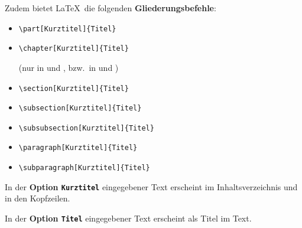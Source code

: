 \begin{frame}[fragile]

\noindent Zudem bietet \LaTeX\ die folgenden \textbf{Gliederungsbefehle}:

\begin{itemize}
\item \lstinline|\part[Kurztitel]{Titel}| 

\item \lstinline|\chapter[Kurztitel]{Titel}| 

(nur in  und , bzw.\ in  und )

\item \lstinline|\section[Kurztitel]{Titel}|

\item \lstinline|\subsection[Kurztitel]{Titel}| 

\item \lstinline|\subsubsection[Kurztitel]{Titel}| 

\item \lstinline|\paragraph[Kurztitel]{Titel}|

\item \lstinline|\subparagraph[Kurztitel]{Titel}|
\end{itemize}

\noindent In der \textbf{Option \texttt{Kurztitel}} eingegebener Text erscheint im Inhaltsverzeichnis und in den Kopfzeilen.

\vspace{.3cm}

\noindent In der \textbf{Option \texttt{Titel}} eingegebener Text erscheint als Titel im Text.

\end{frame}



